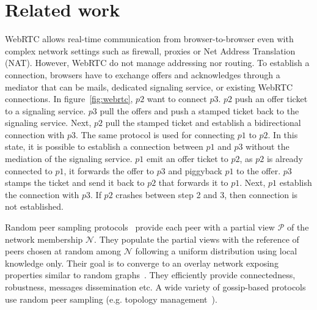 
\section{Related work}
\label{sec:relatedwork}

\begin{figure*}
\centering
{}
\hspace{20pt}
\hspace{20pt}
\caption{\label{fig:webrtc}Creating an overlay network on top of WebRTC.}
\end{figure*}

WebRTC allows real-time communication from browser-to-browser even
with complex network settings such as firewall, proxies or Net Address
Translation (NAT). However, WebRTC do not manage addressing nor
routing. To establish a connection, browsers have to exchange offers
and acknowledges through a mediator that can be mails, dedicated
signaling service, or existing WebRTC connections. In
figure~\ref{fig:webrtc}, $p2$ want to connect $p3$. $p2$ push an offer
ticket to a signaling service. $p3$ pull the offers and push a stamped
ticket back to the signaling service. Next, $p2$ pull the stamped
ticket and establish a bidirectional connection with $p3$. The same
protocol is used for connecting $p1$ to $p2$. In this state, it is
possible to establish a connection between $p1$ and $p3$ without the
mediation of the signaling service. $p1$ emit an offer ticket to $p2$,
as $p2$ is already connected to $p1$, it forwards the offer to $p3$
and piggyback $p1$ to the offer. $p3$ stamps the ticket and send it
back to $p2$ that forwards it to $p1$. Next, $p1$ establish the
connection with $p3$. If $p2$ crashes between step 2 and 3, then
connection is not established.

Random peer sampling protocols~\cite{jelasity2004peer} provide each peer with a
partial view $\mathcal{P}$ of the network membership $\mathcal{N}$. They
populate the partial views with the reference of peers chosen at random among
$\mathcal{N}$ following a uniform distribution using local knowledge
only. Their goal is to converge to an overlay network exposing properties
similar to random graphs~\cite{erdos1959random}. They efficiently provide
connectedness, robustness, messages dissemination etc. A wide variety of
gossip-based protocols use random peer sampling (e.g. topology
management~\cite{voulgaris2005epidemic, jelasity2009tman, dabek2004vivaldi}).

